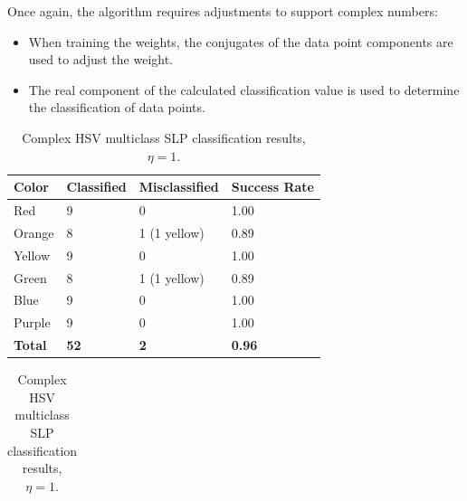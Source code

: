 \documentclass[twoside]{IEEEtran}
\begin{document}
Once again, the algorithm requires adjustments to support complex numbers:
\begin{itemize}
    \item When training the weights, the conjugates of the data point components are used to adjust
          the weight.

    \item The real component of the calculated classification value is used to determine the
          classification of data points.
\end{itemize}

\begin{table}[!t]
    \centering

    \begin{minipage}{\columnwidth}
        \centering
        \caption{RGB multiclass SLP classification results, \( \eta = 1 \).}%
        \label{rgb_slp}
        \begin{tabular}{ l l l l }
            \toprule
            \bfseries Color & \bfseries Classified & \bfseries Misclassified & \bfseries Success Rate \\
            \midrule
            Red             & 9                    & 0                       & 1.00                   \\
            Orange          & 8                    & 1 (1 yellow)            & 0.89                   \\
            Yellow          & 9                    & 0                       & 1.00                   \\
            Green           & 8                    & 1 (1 yellow)            & 0.89                   \\
            Blue            & 9                    & 0                       & 1.00                   \\
            Purple          & 9                    & 0                       & 1.00                   \\
            \midrule
            \bfseries Total & \bfseries 52         & \bfseries 2             & \bfseries 0.96         \\
            \bottomrule
        \end{tabular}
    \end{minipage}%
    \begin{minipage}{\columnwidth}
        \centering
        \caption{Complex HSV multiclass SLP classification results, \( \eta = 1 \).}%
        \label{hsv_slp}
        \begin{tabular}{ l l l l }

\end{tabular}
\end{minipage}
\end{table}
\end{document}
